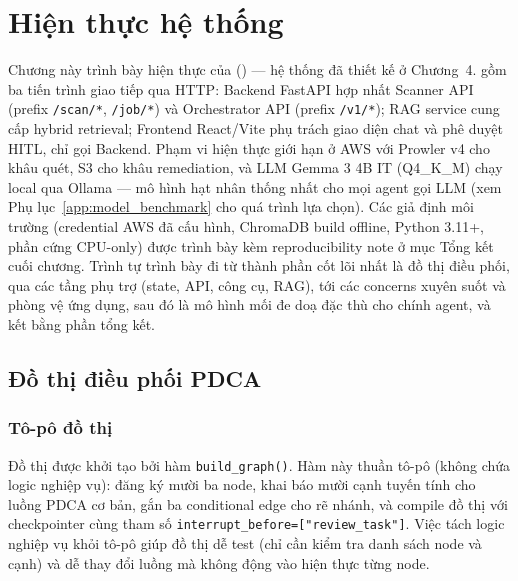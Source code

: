 
\chapter{Hiện thực hệ thống}

Chương này trình bày hiện thực của \sysname{} (\sysnameshort{}) — hệ thống đã thiết kế ở Chương~4. \sysnameshort{} gồm ba tiến trình giao tiếp qua HTTP: Backend FastAPI hợp nhất Scanner API (prefix \texttt{/scan/*}, \texttt{/job/*}) và Orchestrator API (prefix \texttt{/v1/*}); RAG service cung cấp hybrid retrieval; Frontend React/Vite phụ trách giao diện chat và phê duyệt HITL, chỉ gọi Backend. Phạm vi hiện thực giới hạn ở AWS với Prowler v4 cho khâu quét, S3 cho khâu remediation, và LLM Gemma 3 4B IT (Q4\_K\_M) chạy local qua Ollama --- mô hình hạt nhân thống nhất cho mọi agent gọi LLM (xem Phụ lục~\ref{app:model_benchmark} cho quá trình lựa chọn). Các giả định môi trường (credential AWS đã cấu hình, ChromaDB build offline, Python 3.11+, phần cứng CPU-only) được trình bày kèm reproducibility note ở mục Tổng kết cuối chương. Trình tự trình bày đi từ thành phần cốt lõi nhất là đồ thị điều phối, qua các tầng phụ trợ (state, API, công cụ, RAG), tới các concerns xuyên suốt và phòng vệ ứng dụng, sau đó là mô hình mối đe doạ đặc thù cho chính agent, và kết bằng phần tổng kết.



\section{Đồ thị điều phối PDCA}
\label{sec:graph_impl}

\subsection{Tô-pô đồ thị}

Đồ thị được khởi tạo bởi hàm \texttt{build\_graph()}. Hàm này thuần tô-pô (không chứa logic nghiệp vụ): đăng ký mười ba node, khai báo mười cạnh tuyến tính cho luồng PDCA cơ bản, gắn ba conditional edge cho rẽ nhánh, và compile đồ thị với checkpointer cùng tham số \texttt{interrupt\_before=["review\_task"]}. Việc tách logic nghiệp vụ khỏi tô-pô giúp đồ thị dễ test (chỉ cần kiểm tra danh sách node và cạnh) và dễ thay đổi luồng mà không động vào hiện thực từng node.

